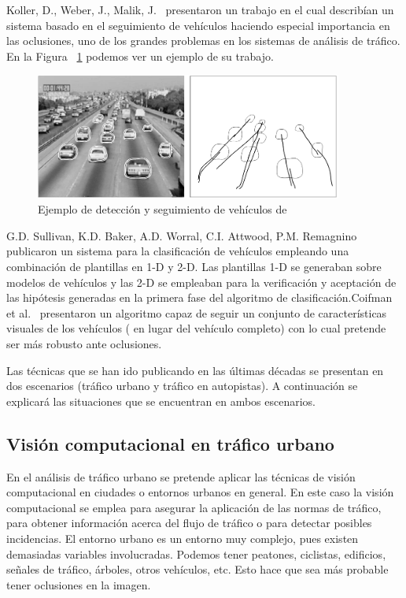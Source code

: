 Koller, D., Weber, J., Malik, J.~\cite{robust_multiple} presentaron un trabajo en el cual describían un sistema basado en el seguimiento de vehículos haciendo especial importancia en las oclusiones, uno de los grandes problemas en los sistemas de análisis de tráfico. En la Figura ~\ref{fig.koller_weber_walik_oclusion} podemos ver un ejemplo de su trabajo.

\begin{figure}[H]
  \begin{center}
    \includegraphics[width=0.9\textwidth]{figures/Introduccion/koller_weber_walik_oclusion.png}
		\caption{Ejemplo de detección y seguimiento de vehículos de~\cite{robust_multiple}}
		\label{fig.koller_weber_walik_oclusion}
		\end{center}
\end{figure}

G.D. Sullivan, K.D. Baker, A.D. Worral, C.I. Attwood, P.M. Remagnino~\cite{model_vehicle_detection} publicaron un sistema para la clasificación de vehículos empleando una combinación de plantillas en 1-D  y 2-D. Las plantillas 1-D se generaban sobre modelos de vehículos y las 2-D se empleaban para la verificación y aceptación de las hipótesis generadas en la primera fase del algoritmo de clasificación.Coifman et al.~\cite{areal_time} presentaron un algoritmo capaz de seguir un conjunto de características visuales de los vehículos ( en lugar del vehículo completo) con lo cual pretende ser más robusto ante oclusiones.

Las técnicas que se han ido publicando en las últimas décadas se presentan en dos escenarios (tráfico urbano y tráfico en autopistas). A continuación se explicará las situaciones que se encuentran en ambos escenarios.

\subsection{Visión computacional en tráfico urbano}\label{ap.vision_computacion_urbano}

En el análisis de tráfico urbano se pretende aplicar las técnicas de visión computacional en ciudades o entornos urbanos en general. En este caso la visión computacional se emplea para asegurar la aplicación de las normas de tráfico, para obtener información acerca del flujo de tráfico o para detectar posibles incidencias. El entorno urbano es un entorno muy complejo, pues existen demasiadas variables involucradas. Podemos tener peatones, ciclistas, edificios, señales de tráfico, árboles, otros vehículos, etc. Esto hace que sea más probable tener oclusiones en la imagen.

